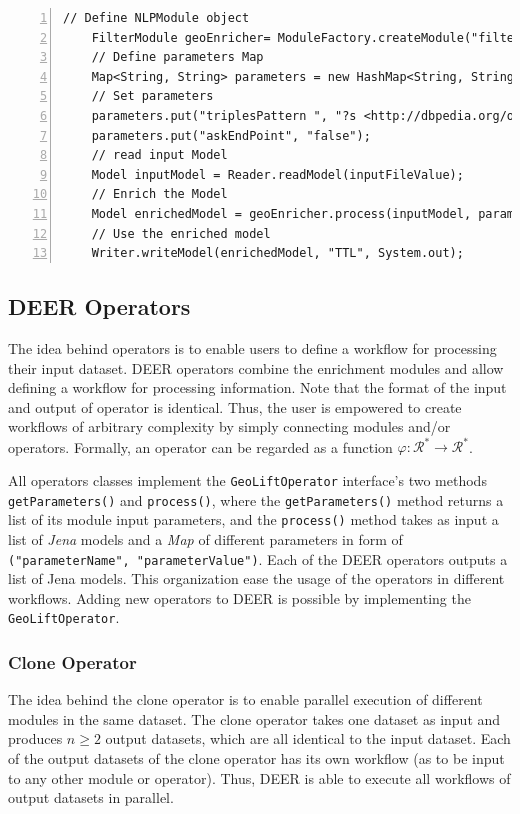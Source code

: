 \documentclass[a4paper,twoside,bibtotoc,abstracton,12pt,BCOR=15mm]{article}
\newcommand{\geolift}{\textsc{DEER}\xspace}
\begin{document}
    \begin{lstlisting}[label=lst:filterModule, float=tp, numbers=left, numberstyle=\tiny, caption = Code fragment to call the \texttt{FilterModule} class.]
    // Define NLPModule object
    FilterModule geoEnricher= ModuleFactory.createModule("filter");
    // Define parameters Map
    Map<String, String> parameters = new HashMap<String, String>();
    // Set parameters
    parameters.put("triplesPattern ", "?s <http://dbpedia.org/ontology/abstract> ?o");
    parameters.put("askEndPoint", "false");
    // read input Model
    Model inputModel = Reader.readModel(inputFileValue);
    // Enrich the Model
    Model enrichedModel = geoEnricher.process(inputModel, parameters);
    // Use the enriched model
    Writer.writeModel(enrichedModel, "TTL", System.out);
    \end{lstlisting}
    
\subsection{\geolift Operators}
The idea behind operators is to enable users to define a workflow for processing their input dataset. 
\geolift operators combine the enrichment modules and allow defining a workflow for processing information.
Note that the format of the input and output of operator is identical. 
Thus, the user is empowered to create workflows of arbitrary complexity by simply connecting modules and/or operators.
Formally, an operator can be regarded as a function $\varphi: \mathcal{R}^* \rightarrow \mathcal{R}^*$.

  All operators classes implement the \texttt{GeoLiftOperator} interface's two methods \texttt{getParameters()} and \texttt{process()},
 where the \texttt{getParameters()} method returns a list of its module input parameters,
 and the \texttt{process()} method takes as input a list of \emph{Jena} models and a \emph{Map} of different parameters in form of \texttt{("parameterName", "parameterValue")}.
 Each of the \geolift operators outputs a list of Jena models.
 This organization ease the usage of the operators in different workflows.
 Adding new operators to \geolift is possible by implementing the \texttt{GeoLiftOperator}.

\subsubsection{Clone Operator}
The idea behind the clone operator is to enable parallel execution of different modules in the same dataset. 
The clone operator takes one dataset as input and produces $n \geq 2$ output datasets, which are all identical to the input dataset.
Each of the output datasets of the clone operator has its own workflow (as to be input to any other module or operator).
Thus, \geolift is able to execute all workflows of output datasets in parallel. 
\end{document}
